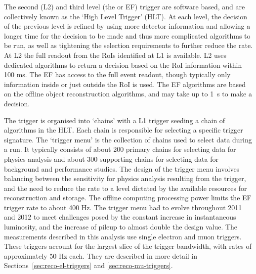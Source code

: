 The second (L2) and third level (the  or EF) trigger are software based, and are collectively known as the
`High Level Trigger' (HLT). At each level, the decision of the previous level is
refined by using more detector information and allowing a longer time for the
decision to be made and thus more complicated algorithms to be run, as well as
tightening the selection requirements to further reduce the rate. At L2 the full
readout from the RoIs identified at L1 is available. L2 uses dedicated
algorithms to return a decision based on the RoI information within 100 ms. The
EF has access to the full event readout, though typically only information
inside or just outside the RoI is used. The EF algorithms are based on the
offline object reconstruction algorithms, and may take up to 1~s to make
a decision.

The trigger is organised into `chains' with a L1 trigger seeding a chain of
algorithms in the HLT. Each chain is responsible for selecting a specific
trigger signature. The `trigger menu' is the collection of chains used to select
data during a run. It typically consists of about 200 primary chains for selecting data
for physics analysis and about 300 supporting chains for selecting data for
background and performance studies. The design of the trigger menu involves
balancing between the sensitivity for physics analysis resulting from the
trigger, and the need to reduce the rate to a level dictated by the available
resources for reconstruction and storage. The offline computing processing power
limits the EF trigger rate to about 400 Hz. The trigger menu had to evolve
throughout 2011 and 2012 to meet challenges posed by the constant increase in
instantaneous luminosity, and the increase of pileup to almost double the design
value. The measurements described in this analysis use single electron and muon
triggers. These triggers account for the largest slice of the trigger bandwidth,
with rates of approximately 50 Hz each. They are described in more detail
in Sections~\ref{sec:reco-el-triggers} and \ref{sec:reco-mu-triggers}.

